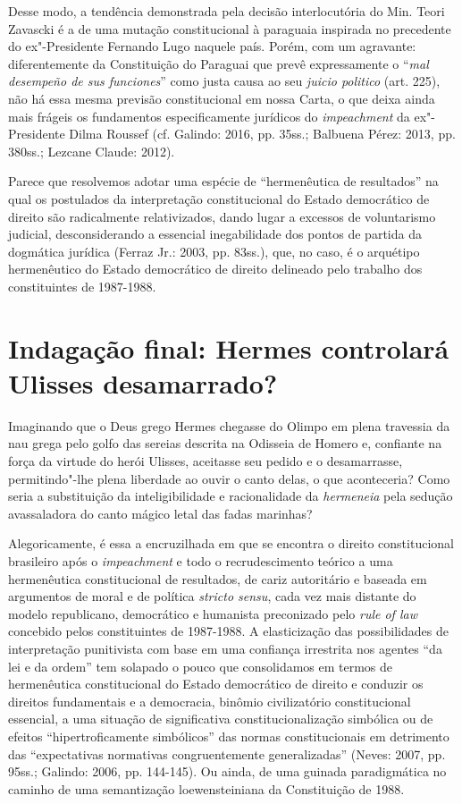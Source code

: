 Desse modo, a tendência demonstrada pela decisão interlocutória do Min.
Teori Zavascki é a de uma mutação constitucional à paraguaia inspirada
no precedente do ex"-Presidente Fernando Lugo naquele país. Porém, com um
agravante: diferentemente da Constituição do Paraguai que prevê
expressamente o ``\emph{mal desempeño de sus funciones}'' como justa
causa ao seu \emph{juicio politico} (art. 225), não há essa mesma
previsão constitucional em nossa Carta, o que deixa ainda mais frágeis
os fundamentos especificamente jurídicos do \emph{impeachment} da
ex"-Presidente Dilma Roussef (cf. Galindo: 2016, pp. 35ss.; Balbuena
Pérez: 2013, pp. 380ss.; Lezcane Claude: 2012).

Parece que resolvemos adotar uma espécie de ``hermenêutica de
resultados'' na qual os postulados da interpretação constitucional do
Estado democrático de direito são radicalmente relativizados, dando
lugar a excessos de voluntarismo judicial, desconsiderando a essencial
inegabilidade dos pontos de partida da dogmática jurídica (Ferraz Jr.:
2003, pp. 83ss.), que, no caso, é o arquétipo hermenêutico do Estado
democrático de direito delineado pelo trabalho dos constituintes de
1987-1988.

\section{Indagação final: Hermes controlará Ulisses desamarrado?}

Imaginando que o Deus grego Hermes chegasse do Olimpo em plena travessia
da nau grega pelo golfo das sereias descrita na Odisseia de Homero e,
confiante na força da virtude do herói Ulisses, aceitasse seu pedido e o
desamarrasse, permitindo"-lhe plena liberdade ao ouvir o canto delas, o
que aconteceria? Como seria a substituição da inteligibilidade e
racionalidade da \emph{hermeneia} pela sedução avassaladora do canto
mágico letal das fadas marinhas?

Alegoricamente, é essa a encruzilhada em que se encontra o direito
constitucional brasileiro após o \emph{impeachment} e todo o
recrudescimento teórico a uma hermenêutica constitucional de resultados,
de cariz autoritário e baseada em argumentos de moral e de política
\emph{stricto sensu}, cada vez mais distante do modelo republicano,
democrático e humanista preconizado pelo \emph{rule of law} concebido
pelos constituintes de 1987-1988. A elasticização das possibilidades de
interpretação punitivista com base em uma confiança irrestrita nos
agentes ``da lei e da ordem'' tem solapado o pouco que consolidamos em
termos de hermenêutica constitucional do Estado democrático de direito e
conduzir os direitos fundamentais e a democracia, binômio civilizatório
constitucional essencial, a uma situação de significativa
constitucionalização simbólica ou de efeitos ``hipertroficamente
simbólicos'' das normas constitucionais em detrimento das ``expectativas
normativas congruentemente generalizadas'' (Neves: 2007, pp. 95ss.;
Galindo: 2006, pp. 144-145). Ou ainda, de uma guinada paradigmática no
caminho de uma semantização loewensteiniana da Constituição de 1988.

